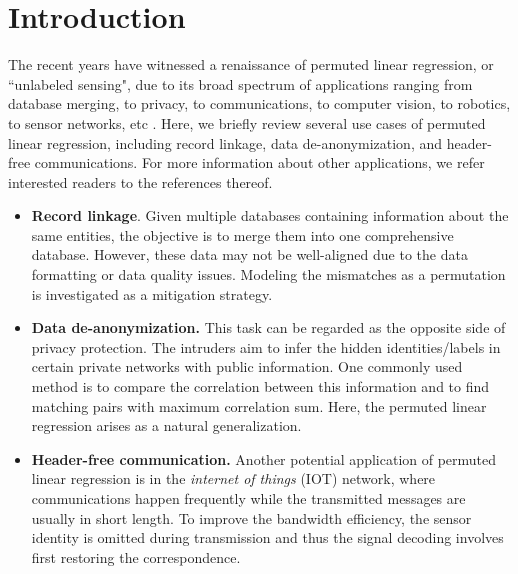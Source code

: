 \documentclass[11pt]{article}
\begin{document}
\vspace{0.2in}



\newpage

\section{Introduction}\label{sec:intro}
The recent years  have witnessed a renaissance of permuted linear regression, or ``unlabeled sensing", due to its broad spectrum of applications ranging from database merging, to privacy, to communications, to computer vision, to robotics, to sensor networks, etc \citep{pananjady2018linear, unnikrishnan2015unlabeled, slawski2020two, slawski2017linear, pananjady2017denoising, zhang2022permutation}.
Here, we briefly review several use cases of permuted linear regression, including record linkage, data de-anonymization,
and header-free communications. For more information about other applications, we refer interested readers to the references thereof.


\begin{itemize}
\item
\textbf{Record linkage}. Given multiple databases containing
information about the same entities, the objective is to merge them
into one comprehensive database. However,
these data may not be well-aligned due to the data formatting or data quality issues.
Modeling the mismatches as a permutation is investigated as a mitigation strategy.

\item
\textbf{Data de-anonymization.}	
This task can be regarded as the opposite side of privacy protection.
The intruders aim to infer the hidden identities/labels in certain private networks with public information. One commonly used method is to compare the correlation between this information and to find matching pairs with
maximum correlation sum.
Here, the permuted linear regression
arises as a natural generalization.

\item
\textbf{Header-free communication.}
Another potential application of permuted linear regression is in the \emph{internet of things} (IOT) network, where communications happen frequently while the transmitted messages are usually in short length. To improve the bandwidth efficiency, the sensor identity
is omitted during transmission and thus the signal decoding involves
first restoring the correspondence.
\end{itemize}
\end{document}
